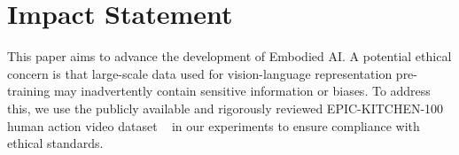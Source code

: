 \section{Impact Statement}
This paper aims to advance the development of Embodied AI. A potential ethical concern is that large-scale data used for vision-language representation pre-training may inadvertently contain sensitive information or biases. To address this, we use the publicly available and rigorously reviewed EPIC-KITCHEN-100 human action video dataset ~\cite{corr18-epickitchen,corr20-epickitchen} in our experiments to ensure compliance with ethical standards.